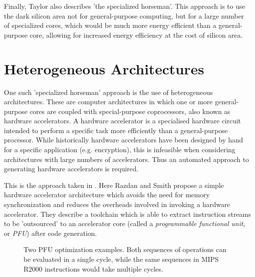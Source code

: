 \documentclass{UoYCSproject}
\begin{document}
Finally, Taylor also describes 'the specialized horseman'. This approach is to use the dark silicon area
not for general-purpose computing, but for a large number of specialized cores, which would be much
more energy efficient than a general-purpose core, allowing for increased energy efficiency at the
cost of silicon area.

\section{Heterogeneous Architectures}

One such 'specialized horseman' approach is the use of heterogeneous architectures.
These are computer architectures in which one or more general-purpose cores are coupled with special-purpose coprocessors,
also known as hardware accelerators. A hardware accelerator is a specialised hardware circuit intended to perform a
specific task more efficiently than a general-purpose processor. While historically hardware accelerators have been designed by
hand for a specific application (e.g. encryption), this is infeasible when considering architectures
with large numbers of accelerators. Thus an automated approach to generating hardware accelerators is required.

This is the approach taken in \cite{high-performance-microarchitecture}. Here Razdan and Smith propose a simple
hardware accelerator architecture which avoids the need for memory synchronization and reduces the overheads involved in
invoking a hardware accelerator. They describe a toolchain which is able to extract instruction streams to be 'outsourced' to an
accelerator core (called a \textit{programmable functional unit}, or \textit{PFU}) after code generation.

\begin{figure}[hbt]
\caption{Two PFU optimization examples. Both sequences of operations can be evaluated in a single cycle, while the same sequences in MIPS R2000 instructions would take multiple cycles. \cite{high-performance-microarchitecture}}
\end{figure}
\end{document}
